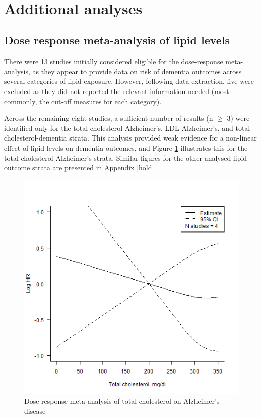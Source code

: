 \documentclass[a4paper, twoside]{templates/ociamthesis}
\begin{document}
~

\hypertarget{additional-analyses-1}{%
\section{Additional analyses}\label{additional-analyses-1}}

\hypertarget{dose-response-results}{%
\subsection{Dose response meta-analysis of lipid levels}\label{dose-response-results}}

There were 13 studies initially considered eligible for the dose-response meta-analysis, as they appear to provide data on risk of dementia outcomes across several categories of lipid exposure. However, following data extraction, five were excluded as they did not reported the relevant information needed (most commonly, the cut-off measures for each category).

Across the remaining eight studies, a sufficient number of results (n \(\geqslant\) 3) were identified only for the total cholesterol-Alzheimer's, LDL-Alzheimer's, and total cholesterol-dementia strata. This analysis provided weak evidence for a non-linear effect of lipid levels on dementia outcomes, and Figure \ref{fig:lipidsDoseResponse} illustrates this for the total cholesterol-Alzheimer's strata. Similar figures for the other analysed lipid-outcome strata are presented in Appendix \ref{hold}.





\begin{figure}[H]

{\centering \includegraphics[width=0.7\linewidth]{figures/sys-rev/dr_AD_TC} 

}

\caption[Dose-response meta-analysis of total cholesterol]{Dose-response meta-analysis of total cholesterol on Alzheimer's disease}\label{fig:lipidsDoseResponse}
\end{figure}
\end{document}
